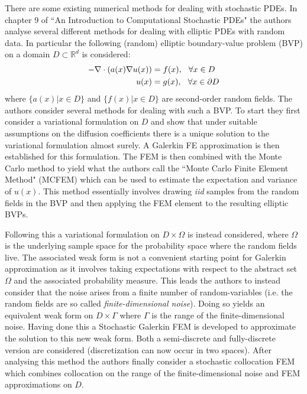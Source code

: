 There are some existing numerical methods for dealing with stochastic PDEs. In chapter 9 of ``An Introduction to Computational Stochastic PDEs" \textcolor{blue}{\citep{lord2014introduction}} the authors analyse several different methods for dealing with elliptic PDEs with random data. In particular the following (random) elliptic boundary-value problem (BVP) on a domain $D\subset\mathbb{R}^d$ is considered:
\begin{align*}
-\nabla \cdot(a(x) \nabla u(x)) &=f(x), \hspace{0.25cm} \forall x \in D \\
u(x) &=g(x), \hspace{0.25cm} \forall x \in \partial D
\end{align*}
where $\{a(x)|x\in D\}$ and $\{f(x)|x\in D\}$ are second-order random fields. The authors consider several methods for dealing with such a BVP. To start they first consider a variational formulation on $D$ and show that under suitable assumptions on the diffusion coefficients there is a unique solution to the variational formulation almost surely. A Galerkin FE approximation is then established for this formulation.
The FEM is then combined with the Monte Carlo method to yield what the authors call the ``Monte Carlo Finite Element Method" (MCFEM) which can be used to estimate the expectation and variance of $u(x)$. This method essentially involves drawing \textit{iid} samples from the random fields in the BVP and then applying the FEM element to the resulting elliptic BVPs.

Following this a variational formulation on $D\times\Omega$ is instead considered, where $\Omega$ is the underlying sample space for the probability space where the random fields live. The associated weak form is not a convenient starting point for Galerkin approximation as it involves taking expectations with respect to the abstract set $\Omega$ and the associated probability measure.
This leads the authors to instead consider that the noise arises from a finite number of random-variables (i.e. the random fields are so called \textit{finite-dimensional noise}). Doing so yields an equivalent weak form on $D\times\Gamma$ where $\Gamma$ is the range of the finite-dimensional noise. Having done this a Stochastic Galerkin FEM is developed to approximate the solution to this new weak form. Both a semi-discrete and fully-discrete version are considered (discretization can now occur in two spaces). After analysing this method the authors finally consider a stochastic collocation FEM which combines collocation on the range of the finite-dimensional noise and FEM approximations on $D$.

